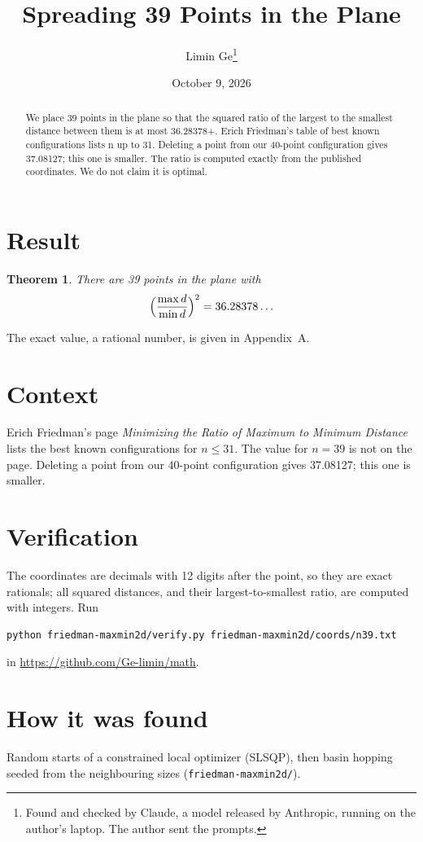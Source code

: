 \documentclass[11pt,a4paper]{article}
\title{Spreading 39 Points in the Plane}
\author{Limin Ge\thanks{Found and checked by Claude, a model released by Anthropic, running on the author's laptop. The author sent the prompts.}}
\date{October 9, 2026}
\newtheorem*{theorem}{Theorem}
\begin{document}
\maketitle
\begin{abstract}
We place 39 points in the plane so that the squared ratio of the largest to the smallest distance between them is at most 36.28378+. Erich Friedman's table of best known configurations lists n up to 31. Deleting a point from our 40-point configuration gives 37.08127; this one is smaller. The ratio is computed exactly from the published coordinates. We do not claim it is optimal.
\end{abstract}

\section{Result}
\begin{theorem}
There are 39 points in the plane with
\[ \Bigl(\frac{\max d}{\min d}\Bigr)^2 = 36.28378\ldots \]
\end{theorem}
The exact value, a rational number, is given in Appendix~A.


\section{Context}
Erich Friedman's page \emph{Minimizing the Ratio of Maximum to Minimum Distance} lists the best known configurations for $n\le 31$. The value for $n=39$ is not on the page. Deleting a point from our 40-point configuration gives 37.08127; this one is smaller.


\section{Verification}
The coordinates are decimals with 12 digits after the point, so they are exact rationals; all squared distances, and their largest-to-smallest ratio, are computed with integers. Run
\begin{verbatim}
python friedman-maxmin2d/verify.py friedman-maxmin2d/coords/n39.txt
\end{verbatim}
in \url{https://github.com/Ge-limin/math}.


\section{How it was found}
Random starts of a constrained local optimizer (SLSQP), then basin hopping seeded from the neighbouring sizes (\texttt{friedman-maxmin2d/}).
\end{document}
